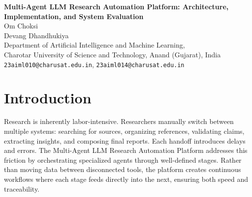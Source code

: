 \documentclass[12pt, a4paper]{article}
\begin{document}
\begin{center}
  {\Large \textbf{Multi-Agent LLM Research Automation Platform: Architecture, Implementation, and System Evaluation}}\\[1em]
  Om Choksi\\[0.25em]
  Devang Dhandhukiya\\[0.5em]
  \small
  Department of Artificial Intelligence and Machine Learning,\\
  Charotar University of Science and Technology, Anand (Gujarat), India\\[0.3em]
  \texttt{23aiml010@charusat.edu.in}, \texttt{23aiml014@charusat.edu.in}
\end{center}

\begin{abstract}
This report presents a Multi-Agent LLM Research Automation Platform built with Python, Node.js, Next.js, PostgreSQL, and Redis running across containerized services. The system orchestrates research through five stages—discovery, retrieval, synthesis, critique, and reporting—delivering reliable automation for complex investigative work. Key design features include workspace isolation for multi-tenant safety, health monitoring for reliability, and event-driven traceability for observability. Every claim in this report traces back to verified implementation artifacts in the codebase.

\textbf{Keywords:} Multi-Agent Systems, LangGraph, LLM Orchestration, FastAPI, Docker.
\end{abstract}

\section{Introduction}

Research is inherently labor-intensive.  Researchers manually switch between multiple systems: searching for sources, organizing references, validating claims, extracting insights, and composing final reports. Each handoff introduces delays and errors. The Multi-Agent LLM Research Automation Platform addresses this friction by orchestrating specialized agents through well-defined stages. Rather than moving data between disconnected tools, the platform creates continuous workflows where each stage feeds directly into the next, ensuring both speed and traceability.
\end{document}
